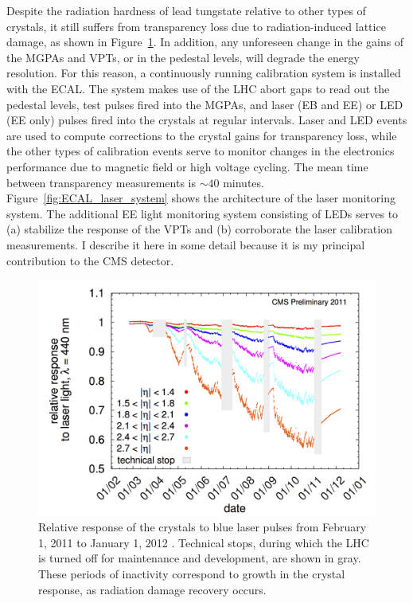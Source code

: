 \documentclass[dissertation.tex]{subfiles}
\begin{document}
Despite the radiation hardness of lead tungstate relative to other types of crystals, it still suffers from transparency loss due to radiation-induced lattice damage, as shown in Figure~\ref{fig:ECAL_rad_damage}.  In addition, any unforeseen change in the gains of the MGPAs and VPTs, or in the pedestal levels, will degrade the energy resolution.  For this reason, a continuously running calibration system is installed with the ECAL.  The system makes use of the LHC abort gaps to read out the pedestal levels, test pulses fired into the MGPAs, and laser (EB and EE) or LED (EE only) pulses fired into the crystals at regular intervals.  Laser and LED events are used to compute corrections to the crystal gains for transparency loss, while the other types of calibration events serve to monitor changes in the electronics performance due to magnetic field or high voltage cycling.  The mean time between transparency measurements is $\sim40$ minutes.  Figure~\ref{fig:ECAL_laser_system} shows the architecture of the laser monitoring system.  The additional EE light monitoring system consisting of LEDs serves to (a) stabilize the response of the VPTs and (b) corroborate the laser calibration measurements.  I describe it here in some detail because it is my principal contribution to the CMS detector.

\begin{figure}
	\centering
	\includegraphics[scale=1.0]{ECAL_rad_damage}
	\caption{Relative response of the crystals to blue laser pulses from February 1, 2011 to January 1, 2012 \cite{ECAL_DPG_Twiki_rad_damage}.  Technical stops, during which the LHC is turned off for maintenance and development, are shown in gray.  These periods of inactivity correspond to growth in the crystal response, as radiation damage recovery occurs.}
	\label{fig:ECAL_rad_damage}
\end{figure}
\end{document}
